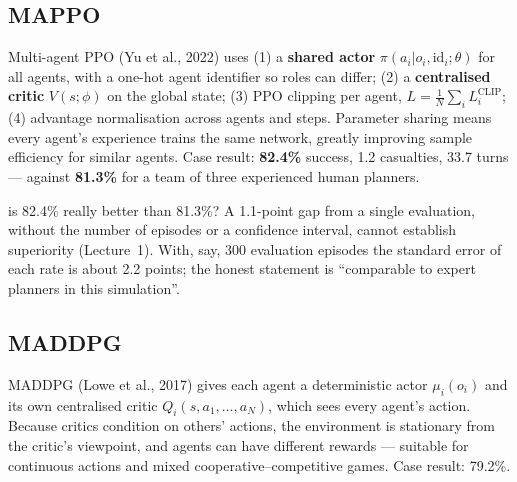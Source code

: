 \documentclass[11pt]{article}
\begin{document}
\subsection{MAPPO}
Multi-agent PPO (Yu et al., 2022) uses (1) a \textbf{shared actor} $\pi(a_i|o_i,\text{id}_i;\theta)$ for all agents, with a one-hot agent identifier so roles can differ; (2) a \textbf{centralised critic} $V(s;\phi)$ on the global state; (3) PPO clipping per agent, $L=\frac1N\sum_iL_i^{\text{CLIP}}$; (4) advantage normalisation across agents and steps. Parameter sharing means every agent's experience trains the same network, greatly improving sample efficiency for similar agents. Case result: \textbf{82.4\%} success, 1.2 casualties, 33.7 turns --- against \textbf{81.3\%} for a team of three experienced human planners.
\begin{pitfall}{is 82.4\% really better than 81.3\%?}
A 1.1-point gap from a single evaluation, without the number of episodes or a confidence interval, cannot establish superiority (Lecture~1). With, say, 300 evaluation episodes the standard error of each rate is about 2.2 points; the honest statement is ``comparable to expert planners in this simulation''.
\end{pitfall}

\subsection{MADDPG}
MADDPG (Lowe et al., 2017) gives each agent a deterministic actor $\mu_i(o_i)$ and its own centralised critic $Q_i(s,a_1,\ldots,a_N)$, which sees every agent's action. Because critics condition on others' actions, the environment is stationary from the critic's viewpoint, and agents can have different rewards --- suitable for continuous actions and mixed cooperative--competitive games. Case result: 79.2\%.
\end{document}
